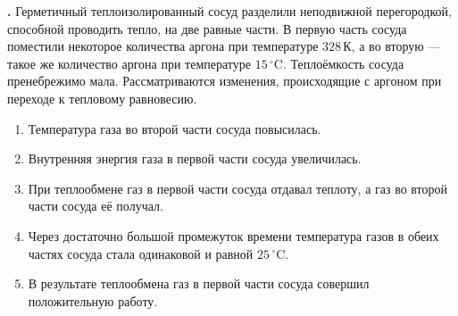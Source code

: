 \documentclass[12pt,a4paper]{article}
\newif\ifShowSolutions
\newcounter{banktask}
\newcommand{\BankTask}[3]{%
  \refstepcounter{banktask}%
  \Needspace{35mm}\par\medskip\noindent\begin{minipage}{\linewidth}%
  \noindent\textbf{\thebanktask.}\quad #2\par
  \ifShowSolutions
    #3\par
    \ifdefined\TutorEdition
      \ifcsname TutorSource#1\endcsname
        \smallskip{\small\csname TutorSource#1\endcsname\par}%
      \fi
    \fi
  \fi
  \end{minipage}\par\medskip
}
\begin{document}
\BankTask{0443DE}{
Герметичный теплоизолированный сосуд разделили неподвижной перегородкой, способной проводить тепло, на две равные части. В первую часть сосуда поместили некоторое количества аргона при температуре \(328\,\text{К}\), а во вторую --- такое же количество аргона при температуре \(15\,^{\circ}\mathrm{C}\).
Теплоёмкость сосуда пренебрежимо мала.
Рассматриваются изменения, происходящие с аргоном при переходе к тепловому равновесию.
\begin{enumerate}
\item Температура газа во второй части сосуда повысилась.
\item Внутренняя энергия газа в первой части сосуда увеличилась.
\item При теплообмене газ в первой части сосуда отдавал теплоту, а газ во второй части сосуда её получал.
\item Через достаточно большой промежуток времени температура газов в обеих частях сосуда стала одинаковой и равной \(25\,^{\circ}\mathrm{C}\).
\item В результате теплообмена газ в первой части сосуда совершил положительную работу.
\end{enumerate}
}{
\smallskip\noindent\textbf{Решение от GPT}\par
Начальная температура во второй части \(T_2=15+273=288\,\text{К}\). Объёмы постоянны, поэтому работа каждого газа \(A=0\). По закону сохранения энергии для равных количеств одного газа
\[
T_{\text{равн}}=\frac{328+288}{2}=308\,\text{К}=35\,^{\circ}\mathrm{C}.
\]
\begin{enumerate}
\item Верно: температура второго газа повысилась от \(288\) до \(308\,\text{К}\).
\item Неверно: \(U=\frac32\nu RT\), поэтому при охлаждении первого газа его внутренняя энергия уменьшилась.
\item Верно: теплота передавалась от более горячего первого газа ко второму.
\item Неверно: равновесная температура равна \(35\,^{\circ}\mathrm{C}\).
\item Неверно: при неподвижной перегородке \(A=0\).
\end{enumerate}
Ответ: \(13\).
}
\end{document}
